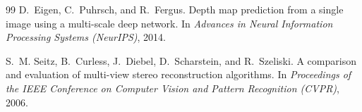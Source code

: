 \documentclass[10pt,twocolumn]{article}
\begin{document}
\begin{thebibliography}{99}
D.~Eigen, C.~Puhrsch, and R.~Fergus.
\newblock Depth map prediction from a single image using a multi-scale deep network.
\newblock In \textit{Advances in Neural Information Processing Systems (NeurIPS)}, 2014.

S.~M. Seitz, B.~Curless, J.~Diebel, D.~Scharstein, and R.~Szeliski.
\newblock A comparison and evaluation of multi-view stereo reconstruction algorithms.
\newblock In \textit{Proceedings of the IEEE Conference on Computer Vision and Pattern Recognition (CVPR)}, 2006.

\end{thebibliography}
\endgroup
\end{document}
